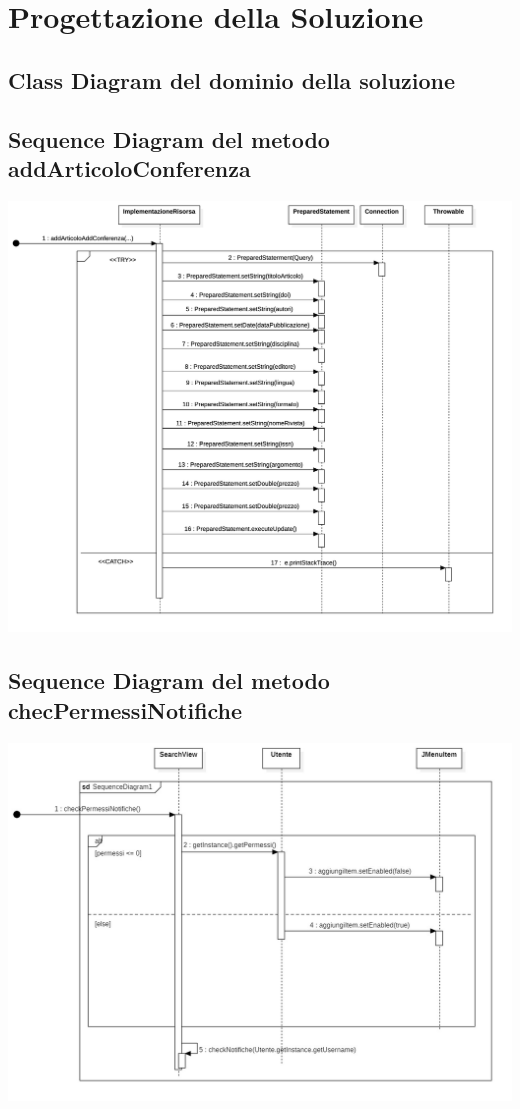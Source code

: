 \chapter{Progettazione della Soluzione}

\section{Class Diagram del dominio della soluzione}
\section{Sequence Diagram del metodo addArticoloConferenza}
\includegraphics[scale=0.15]{Immagini/AddArtConf_SD.png}
\section{Sequence Diagram del metodo checPermessiNotifiche}
\includegraphics[scale=0.28]{Immagini/checkPermNot_SD.jpg}
